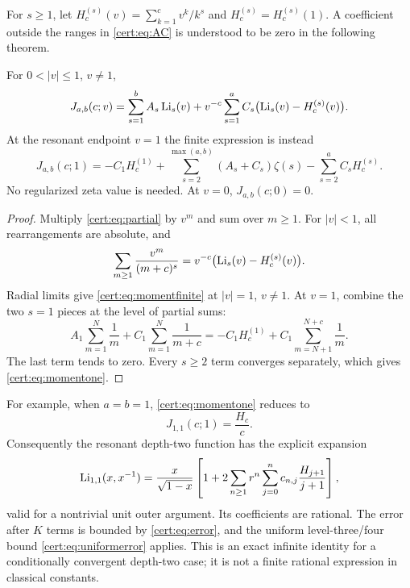 For $s\ge1$, let
$H_c^{(s)}(v)=\sum_{k=1}^c v^k/k^s$ and $H_c^{(s)}=H_c^{(s)}(1)$.
A coefficient outside the ranges in \eqref{cert:eq:AC} is understood to be
zero in the following theorem.

\begin{theorem}
\label{cert:thm:moments}
For $0<|v|\le1$, $v\ne1$,
\begin{equation}
 J_{a,b}(c;v)=\sum_{s=1}^b A_s\operatorname{Li}_s(v)
       +v^{-c}\sum_{s=1}^a C_s\bigl(\operatorname{Li}_s(v)-H_c^{(s)}(v)\bigr).
\label{cert:eq:momentfinite}
\end{equation}
At the resonant endpoint $v=1$ the finite expression is instead
\begin{equation}
 J_{a,b}(c;1)
 =-C_1H_c^{(1)}+
   \sum_{s=2}^{\max(a,b)}(A_s+C_s)\zeta(s)
   -\sum_{s=2}^a C_sH_c^{(s)}.
\label{cert:eq:momentone}
\end{equation}
No regularized zeta value is needed. At $v=0$, $J_{a,b}(c;0)=0$.
\end{theorem}
\begin{proof}
Multiply \eqref{cert:eq:partial} by $v^m$ and sum over $m\ge1$.
For $|v|<1$, all rearrangements are absolute, and
\[
 \sum_{m\ge1}\frac{v^m}{(m+c)^s}
 =v^{-c}\bigl(\operatorname{Li}_s(v)-H_c^{(s)}(v)\bigr).
\]
Radial limits give \eqref{cert:eq:momentfinite} at $|v|=1$, $v\ne1$.
At $v=1$, combine the two $s=1$ pieces at the level of partial sums:
\[
 A_1\sum_{m=1}^N\frac1m+C_1\sum_{m=1}^N\frac1{m+c}
 =-C_1H_c^{(1)}+C_1\sum_{m=N+1}^{N+c}\frac1m.
\]
The last term tends to zero. Every $s\ge2$ term converges separately,
which gives \eqref{cert:eq:momentone}.
\end{proof}

For example, when $a=b=1$, \eqref{cert:eq:momentone} reduces to
\begin{equation}
 J_{1,1}(c;1)=\frac{H_c}{c}.
\label{cert:eq:J11}
\end{equation}
Consequently the resonant depth-two function has the explicit expansion
\begin{equation}
 \operatorname{Li}_{1,1}(x,x^{-1})=
 \frac{x}{\sqrt{1-x}}\left[
 1+2\sum_{n\ge1}r^n\sum_{j=0}^n c_{n,j}\frac{H_{j+1}}{j+1}
 \right],
\label{cert:eq:resonant11}
\end{equation}
valid for a nontrivial unit outer argument. Its coefficients are rational.
The error after $K$ terms is bounded by \eqref{cert:eq:error}, and the uniform
level-three/four bound \eqref{cert:eq:uniformerror} applies.
This is an exact infinite identity for a conditionally
convergent depth-two case; it is not a finite rational expression in
classical constants.

